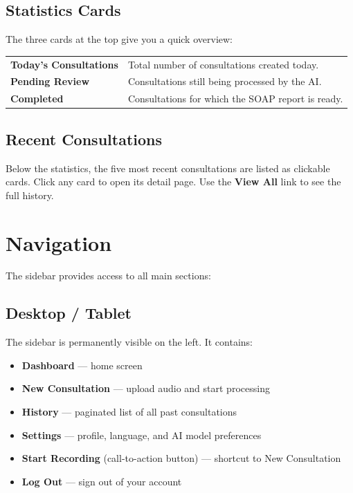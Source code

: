 \documentclass[12pt,a4paper]{article}
\begin{document}
\subsection{Statistics Cards}
The three cards at the top give you a quick overview:
\begin{tabular}{m{3cm}m{9cm}}
	\textbf{Today's Consultations} & Total number of consultations created today.      \\
	\textbf{Pending Review}        & Consultations still being processed by the AI.    \\
	\textbf{Completed}             & Consultations for which the SOAP report is ready. \\
\end{tabular}

\subsection{Recent Consultations}
Below the statistics, the five most recent consultations are listed as clickable cards.
Click any card to open its detail page. Use the \textbf{View All} link to see the full history.

\section{Navigation}

The sidebar provides access to all main sections:

\subsection{Desktop / Tablet}
The sidebar is permanently visible on the left. It contains:
\begin{itemize}
	\item \textbf{Dashboard} — home screen
	\item \textbf{New Consultation} — upload audio and start processing
	\item \textbf{History} — paginated list of all past consultations
	\item \textbf{Settings} — profile, language, and AI model preferences
	\item \textbf{Start Recording} (call-to-action button) — shortcut to New Consultation
	\item \textbf{Log Out} — sign out of your account
\end{itemize}
\end{document}
